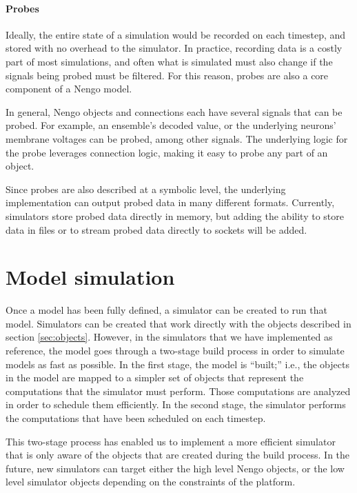 \documentclass{frontiersSCNS}
\begin{document}
\paragraph{Probes}

Ideally, the entire state of a simulation
would be recorded on each timestep,
and stored with no overhead to the simulator.
In practice, recording data
is a costly part of most simulations,
and often what is simulated must also change
if the signals being probed must be filtered.
For this reason, probes are also
a core component of a Nengo model.

In general, Nengo objects and connections
each have several signals that can be probed.
For example, an ensemble's decoded value,
or the underlying neurons' membrane voltages
can be probed, among other signals.
The underlying logic for the probe
leverages connection logic,
making it easy to probe any part of an object.

Since probes are also described
at a symbolic level,
the underlying implementation
can output probed data in many different formats.
Currently, simulators store probed data
directly in memory,
but adding the ability to store data
in files or to stream probed data
directly to sockets will be added.

\section{Model simulation} \label{sec:simulators}

Once a model has been fully defined,
a simulator can be created to
run that model.
Simulators can be created
that work directly with the
objects described in section \ref{sec:objects}.
However, in the simulators that we have implemented
as reference, the model goes through a
two-stage build process in order to
simulate models as fast as possible.
In the first stage,
the model is ``built;''
i.e., the objects in the model are mapped to a simpler
set of objects that represent the computations
that the simulator must perform.
Those computations are analyzed in order to
schedule them efficiently.
In the second stage,
the simulator performs the computations
that have been scheduled on each timestep.

This two-stage process has enabled us
to implement a more efficient simulator
that is only aware of
the objects that are created
during the build process.
In the future,
new simulators can target either
the high level Nengo objects,
or the low level simulator objects
depending on the constraints of the platform.
\end{document}

